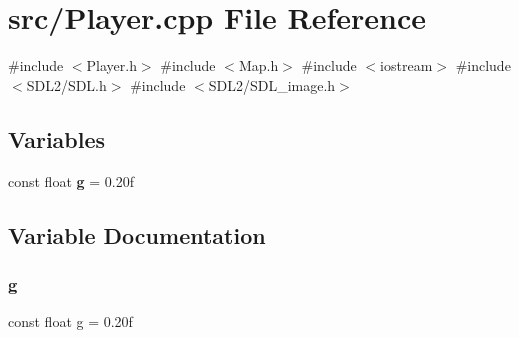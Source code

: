 \section{src/\+Player.cpp File Reference}
\label{_player_8cpp}
{\ttfamily \#include $<$Player.\+h$>$}\newline
{\ttfamily \#include $<$Map.\+h$>$}\newline
{\ttfamily \#include $<$iostream$>$}\newline
{\ttfamily \#include $<$S\+D\+L2/\+S\+D\+L.\+h$>$}\newline
{\ttfamily \#include $<$S\+D\+L2/\+S\+D\+L\+\_\+image.\+h$>$}\newline
\subsection*{Variables}
\begin{DoxyCompactItemize}
\item 
const float \textbf{ g} = 0.\+20f
\end{DoxyCompactItemize}


\subsection{Variable Documentation}
\mbox{\label{_player_8cpp_a34a8030233d73a4fbcc839627b28715f}} 
\subsubsection{g}
{\footnotesize\ttfamily const float g = 0.\+20f}

